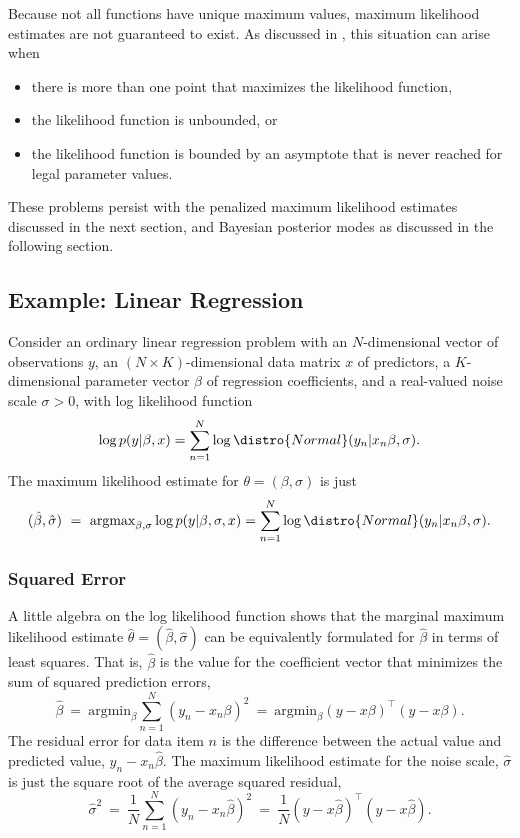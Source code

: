 Because not all functions have unique maximum values, maximum
likelihood estimates are not guaranteed to exist.  As discussed in
, this situation can arise when
%
\begin{itemize}
\item there is more than one point that maximizes the likelihood function,
\item the likelihood function is unbounded, or
\item the likelihood function is bounded by an asymptote that is never
  reached for legal parameter values.
\end{itemize}
%
These problems persist with the penalized maximum likelihood estimates
discussed in the next section, and Bayesian posterior modes as
discussed in the following section.


\subsection{Example: Linear Regression}

Consider an ordinary linear regression problem with an $N$-dimensional
vector of observations $y$, an $(N \times K)$-dimensional data matrix
$x$ of predictors, a $K$-dimensional parameter vector $\beta$ of
regression coefficients, and a real-valued noise scale $\sigma > 0$,
with log likelihood function
\[
\log p(y|\beta,x) = \sum_{n=1}^N \log \distro{Normal}(y_n|x_n \beta,
\sigma).
\]
%
The maximum likelihood estimate for $\theta = (\beta,\sigma)$ is just
\[
(\hat{\beta},\hat{\sigma})
\ = \
\mbox{argmax}_{\beta,\sigma}
\log p(y|\beta,\sigma,x) = \sum_{n=1}^N \log \distro{Normal}(y_n|x_n \beta, \sigma).
\]

\subsubsection{Squared Error}

A little algebra on the log likelihood function shows that the
marginal maximum likelihood estimate $\hat{\theta} =
(\hat{\beta},\hat{\sigma})$ can be equivalently formulated for
$\hat{\beta}$ in terms of least squares.  That is, $\hat{\beta}$ is
the value for the coefficient vector that minimizes the sum of squared
prediction errors,
%
\[
\hat{\beta}
\ = \
\mbox{argmin}_{\beta} \sum_{n=1}^N (y_n - x_n \beta)^2
\ = \
\mbox{argmin}_{\beta} (y - x \beta)^{\top} (y - x\beta).
\]
%
The residual error for data item $n$ is the difference between the
actual value and predicted value, $y_n - x_n \hat{\beta}$.  The
maximum likelihood estimate for the noise scale, $\hat{\sigma}$ is
just the square root of the average squared residual,
\[
\hat{\sigma}^2
\ = \
\frac{1}{N} \sum_{n=1}^N \left( y_n - x_n \hat{\beta} \right)^2
\ = \
\frac{1}{N} (y - x \hat{\beta})^{\top} (y - x\hat{\beta}).
\]

